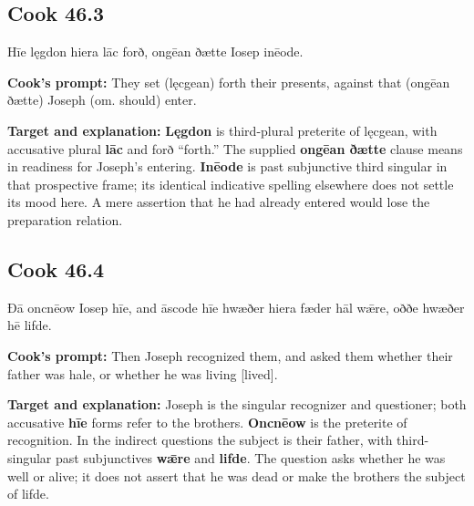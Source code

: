 \par\begin{minipage}{\linewidth}\raggedright
\subsection*{Cook 46.3}

Hīe lęgdon hiera lāc forð, ongēan ðætte Iosep inēode.

\textbf{Cook’s prompt:} They set (lęcgean) forth their presents, against that (ongēan ðætte) Joseph (om. should) enter.

\textbf{Target and explanation:} \textbf{Lęgdon} is third-plural preterite of lęcgean, with accusative plural \textbf{lāc} and forð “forth.” The supplied \textbf{ongēan ðætte} clause means in readiness for Joseph’s entering. \textbf{Inēode} is past subjunctive third singular in that prospective frame; its identical indicative spelling elsewhere does not settle its mood here. A mere assertion that he had already entered would lose the preparation relation.

\end{minipage}\par\addvspace{4pt}

\par\begin{minipage}{\linewidth}\raggedright
\subsection*{Cook 46.4}

Ðā oncnēow Iosep hīe, and āscode hīe hwæðer hiera fæder hāl wǣre, oððe hwæðer hē lifde.

\textbf{Cook’s prompt:} Then Joseph recognized them, and asked them whether their father was hale, or whether he was living [lived].

\textbf{Target and explanation:} Joseph is the singular recognizer and questioner; both accusative \textbf{hīe} forms refer to the brothers. \textbf{Oncnēow} is the preterite of recognition. In the indirect questions the subject is their father, with third-singular past subjunctives \textbf{wǣre} and \textbf{lifde}. The question asks whether he was well or alive; it does not assert that he was dead or make the brothers the subject of lifde.

\end{minipage}\par\addvspace{4pt}

